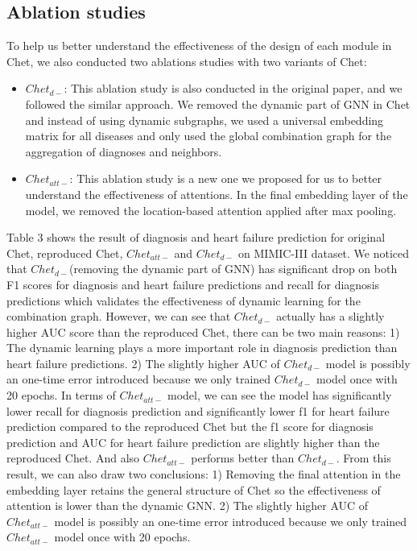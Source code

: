 \documentclass[11pt,a4paper,fleqn]{article}
\begin{document}
\subsection{Ablation studies}
To help us better understand the effectiveness of the design of each module in Chet,
we also conducted two ablations studies with two variants of Chet:
\begin{itemize}
  \item $Chet_{d-}$: This ablation study is also conducted in the original paper, and we followed the similar approach. 
  We removed the dynamic part of GNN in Chet and instead of using dynamic subgraphs, we used a universal embedding matrix
  for all diseases and only used the global combination graph for the aggregation of diagnoses and neighbors.
  \item $Chet_{att-}$: This ablation study is a new one we proposed for us to better understand the effectiveness of attentions.
  In the final embedding layer of the model, we removed the location-based attention applied after max pooling.  
\end{itemize}
Table 3 shows the result of diagnosis and heart failure prediction for original Chet, reproduced Chet, $Chet_{att-}$ and $Chet_{d-}$ on MIMIC-III dataset. We noticed that $Chet_{d-}$(removing the dynamic part of GNN) has significant drop on both F1 scores for diagnosis and heart failure predictions and recall for  diagnosis predictions which validates the effectiveness of dynamic learning for the combination graph. However, we can see that $Chet_{d-}$ actually has a slightly higher AUC score than the reproduced Chet, there can be two main reasons: 1) The dynamic learning plays a more important role in diagnosis prediction than heart failure predictions. 2) The slightly higher AUC of $Chet_{d-}$ model is possibly an one-time error introduced because we only trained $Chet_{d-}$ model once with 20 epochs. In terms of $Chet_{att-}$ model, we can see the model has significantly lower recall for diagnosis prediction and significantly lower f1 for heart failure prediction compared to the reproduced Chet but the f1 score for diagnosis prediction and AUC for heart failure prediction are slightly higher than the reproduced Chet. And also $Chet_{att-}$ performs better than  $Chet_{d-}$. From this result, we can also draw two conclusions: 1) Removing the final attention in the embedding layer retains the general structure of Chet so the effectiveness of attention is lower than the dynamic GNN. 2) The slightly higher AUC of $Chet_{att-}$ model is possibly an one-time error introduced because we only trained $Chet_{att-}$ model once with 20 epochs.
\end{document}
